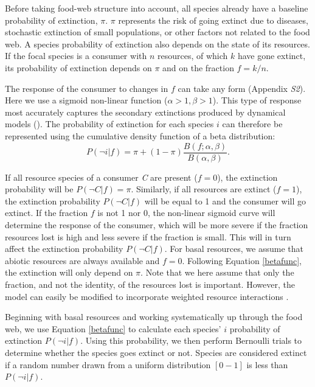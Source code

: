 \documentclass[12pt]{article}
\begin{document}
\begin{spacing}{2.0}
		Before taking food-web structure into account, all species already have a baseline probability of extinction, $\pi$. 
		$\pi$ represents the risk of going extinct due to diseases, stochastic extinction of small populations, or other factors not related to the food web.
		A species probability of extinction also depends on the state of its resources. 
        If the focal species is a consumer with $n$ resources, of which $k$ have gone extinct, its probability of extinction depends on $\pi$ and on the fraction $f = k/n$.
        
        
        The response of the consumer to changes in $f$ can take any form (Appendix \emph{S2}). Here we use a sigmoid non-linear function ($\alpha > 1, \beta > 1$).
		This type of response most accurately captures the secondary extinctions produced by dynamical models (\citealp[]{Eklof2013}).
		The probability of extinction for each species $i$ can therefore be represented using the cumulative density function of a beta distribution:
		\begin{equation}
		P(\lnot i|f) = \pi + (1 - \pi) \frac{B(f;\alpha,\beta)}{B(\alpha,\beta)}.
				\label{betafunc}
        \end{equation}
		
		If all resource species of a consumer \textit{C} are present ($f = 0$), the extinction probability will be $P(\lnot C|f) = \pi$. 
		Similarly, if all resources are extinct ($f = 1$), the extinction probability $P(\lnot C|f)$ will be equal to 1 and the consumer will go extinct.
		If the fraction $f$ is not 1 nor 0, the non-linear sigmoid curve will determine the response of the consumer, which will be more severe if the fraction resources lost is high and less severe if the fraction is small. This will in turn affect the extinction probability $P(\lnot C|f)$.
		For basal resources, we assume that abiotic resources are always available and $f=0$. Following Equation \ref{betafunc}, the extinction will only depend on $\pi$.
		Note that we here assume that only the fraction, and not the identity, of the resources lost is important. 
		However, the model can easily be modified to incorporate weighted resource interactions \citep[see][]{Eklof2013}.
		
		
        Beginning with basal resources and working systematically up through the food web, we use Equation \ref{betafunc} to calculate each species' $i$ probability of extinction $P(\lnot i|f)$.
        Using this probability, we then perform Bernoulli trials to determine whether the species goes extinct or not. 
        Species are considered extinct if a random number drawn from a uniform distribution $[0-1]$ is less than $P(\lnot i|f)$.



\end{spacing}
\end{document}
